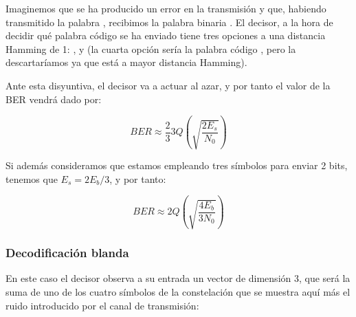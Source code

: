 \documentclass[es,apuntes]{uah}
\begin{document}
Imaginemos que se ha producido un error en la transmisión y que, habiendo transmitido la palabra , recibimos la palabra binaria . El decisor, a la hora de decidir qué palabra código se ha enviado tiene tres opciones a una distancia Hamming de 1: ,  y  (la cuarta opción sería la palabra código , pero la descartaríamos ya que está a mayor distancia Hamming). 

Ante esta disyuntiva, el decisor va a actuar al azar, y por tanto el valor de la BER vendrá dado por:

\begin{displaymath}
	BER \approx \frac{2}{3} 3 Q \left ( \sqrt{\frac{2 E_s}{N_0}} \right )
\end{displaymath}


Si además consideramos que estamos empleando tres símbolos para enviar 2 bits, tenemos que $E_s = 2E_b / 3$, y por tanto:

\begin{displaymath}
	BER \approx 2 Q \left ( \sqrt{\frac{4 E_b}{3 N_0}} \right )
\end{displaymath}


\subsubsection{Decodificación blanda}

En este caso el decisor observa a su entrada un vector de dimensión 3, que será la suma de uno de los cuatro símbolos de la constelación que se muestra aquí más el ruido introducido por el canal de transmisión:
\end{document}
